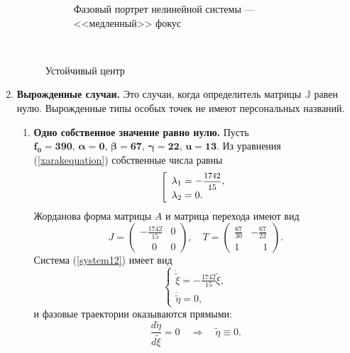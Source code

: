 \documentclass[12pt, a4paper]{article}
\begin{document}
\begin{enumerate}
\begin{figure}[H]
\begin{subfigure}[H]{0.4\textwidth}
		\caption{Фазовый портрет нелинейной системы --- <<медленный>> фокус}
	\end{subfigure}	
	\\[0.2cm]
	\caption{Устойчивый центр}
\end{figure}	
	\item \textbf{Вырожденные случаи.} Это случаи, когда определитель матрицы $\mathbb{J}$ равен нулю. Вырожденные типы особых точек не имеют персональных названий.
\begin{enumerate}
	\item \textbf{Одно собственное значение равно нулю.} Пусть $\boldsymbol{f_0=390,\,\alpha=0,\,\beta=67,\,\gamma=22,\,u=13}$. 
	Из уравнения (\ref{xarakequation}) собственные числа равны
	\[
	\left[
	\begin{array}{l}
		\lambda_1=-\hbox{\footnotesize$\displaystyle\frac{1742}{15}$}, \\
		\lambda_2=0.
	\end{array}
	\right.
	\]
	Жорданова форма матрицы $A$ и матрица перехода имеют вид
	\[
	J=\begin{pmatrix}
		-\frac{1742}{15} & 0 \\
		\phantom{-}0 & 0
	\end{pmatrix},
	\quad
	T=\begin{pmatrix}
		\frac{67}{30} & -\frac{67}{22} \\
		1 & \phantom{-}1
	\end{pmatrix}.
	\]
	Система (\ref{system12}) имеет вид
	\[
	\begin{cases}
		\dot{\tilde{\xi}}=-\frac{1742}{15}\tilde{\xi},\\
		\dot{\tilde{\eta}}=0,
	\end{cases}
	\]
	и фазовые траектории оказываются прямыми:
	\[
	\frac{d\tilde{\eta}}{d\tilde{\xi}}=0
	\quad\Rightarrow\quad
	\tilde{\eta}\equiv 0.
	\]
	

\end{enumerate}
\end{enumerate}
\end{document}
